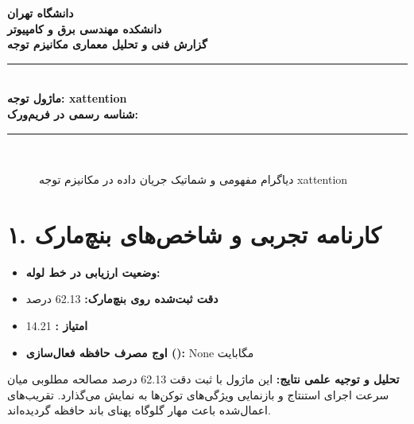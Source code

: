 \documentclass[12pt,a4paper]{article}
\begin{document}
\begin{center}
{\Large\bfseries دانشگاه تهران}\\[0.2cm]
{\large\bfseries دانشکده مهندسی برق و کامپیوتر}\\[0.2cm]
{\large\bfseries گزارش فنی و تحلیل معماری مکانیزم توجه}\\[0.5cm]
\rule{\linewidth}{1pt}\\[0.3cm]
{\LARGE\bfseries ماژول توجه: xattention}\\[0.2cm]
{\large \textbf{شناسه رسمی در فریم‌ورک:} }\\[0.2cm]
\rule{\linewidth}{1pt}\\[0.5cm]
\end{center}

\begin{figure}[H]
\centering
{}
\caption{دیاگرام مفهومی و شماتیک جریان داده در مکانیزم توجه xattention}
\end{figure}

\section*{۱. کارنامه تجربی و شاخص‌های بنچ‌مارک}
\begin{itemize}
\item \textbf{وضعیت ارزیابی در خط لوله:} 
\item \textbf{دقت ثبت‌شده روی بنچ‌مارک:} 62.13 درصد
\item \textbf{امتیاز :} 14.21
\item \textbf{اوج مصرف حافظه فعال‌سازی ():} None مگابایت
\end{itemize}
\textbf{تحلیل و توجیه علمی نتایج:} این ماژول با ثبت دقت 62.13 درصد مصالحه مطلوبی میان سرعت اجرای استنتاج و بازنمایی ویژگی‌های توکن‌ها به نمایش می‌گذارد. تقریب‌های اعمال‌شده باعث مهار گلوگاه پهنای باند حافظه گردیده‌اند.
\end{document}
